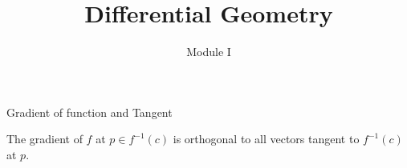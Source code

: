 \documentclass{beamer}
\title{Differential Geometry}
\author{Module I}
\institute{Chapter 3 : Tangent Space}
\begin{document}
\begin{frame}
\maketitle
\end{frame}

\begin{frame}{Gradient of function and Tangent}
\begin{lemma}
	The gradient of $f$ at $p \in f^{-1}(c)$ is orthogonal to all vectors tangent to $f^{-1}(c)$ at $p$.
\end{lemma}
\end{frame}
\end{document}
